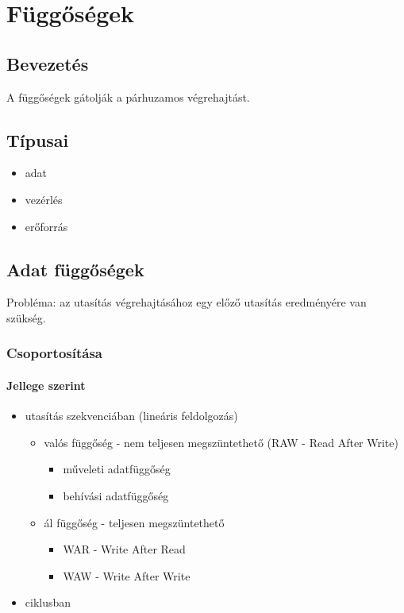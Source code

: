 
\chapter{Függőségek} \label{fuggosegek}

\section{Bevezetés}
A függőségek gátolják a párhuzamos végrehajtást.

\section{Típusai}
\begin{itemize}
    \item adat
    \item vezérlés
    \item erőforrás
\end{itemize}

\section{Adat függőségek}
Probléma: az utasítás végrehajtásához egy előző utasítás eredményére van szükség.

\subsection{Csoportosítása}
\subsubsection{Jellege szerint}
\begin{itemize}
    \item utasítás szekvenciában (lineáris feldolgozás)
          \begin{itemize}
              \item valós függőség - nem teljesen megszüntethető (RAW - Read After Write)
                    \begin{itemize}
                        \item műveleti adatfüggőség
                        \item behívási adatfüggőség
                    \end{itemize}
              \item ál függőség - teljesen megszüntethető
                    \begin{itemize}
                        \item WAR - Write After Read
                        \item WAW - Write After Write
                    \end{itemize}
          \end{itemize}
    \item ciklusban
\end{itemize}
